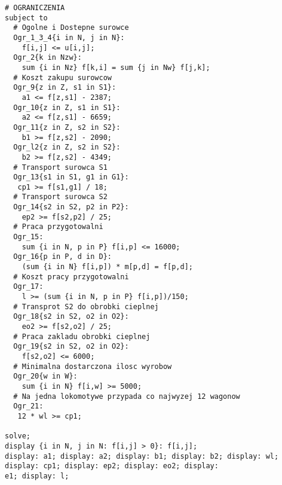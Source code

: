 \documentclass[12pt]{article}
\begin{document}
\begin{lstlisting}[caption= plik mod]
# OGRANICZENIA
subject to
  # Ogolne i Dostepne surowce
  Ogr_1_3_4{i in N, j in N}:
    f[i,j] <= u[i,j];
  Ogr_2{k in Nzw}:
    sum {i in Nz} f[k,i] = sum {j in Nw} f[j,k];    
  # Koszt zakupu surowcow
  Ogr_9{z in Z, s1 in S1}:
    a1 <= f[z,s1] - 2387;
  Ogr_10{z in Z, s1 in S1}:
    a2 <= f[z,s1] - 6659;
  Ogr_11{z in Z, s2 in S2}:
    b1 >= f[z,s2] - 2090;
  Ogr_l2{z in Z, s2 in S2}:
    b2 >= f[z,s2] - 4349;
  # Transport surowca S1
  Ogr_13{s1 in S1, g1 in G1}:
   cp1 >= f[s1,g1] / 18;
  # Transport surowca S2
  Ogr_14{s2 in S2, p2 in P2}:
    ep2 >= f[s2,p2] / 25;
  # Praca przygotowalni
  Ogr_15: 
    sum {i in N, p in P} f[i,p] <= 16000;
  Ogr_16{p in P, d in D}:
    (sum {i in N} f[i,p]) * m[p,d] = f[p,d];
  # Koszt pracy przygotowalni
  Ogr_17: 
    l >= (sum {i in N, p in P} f[i,p])/150;
  # Transprot S2 do obrobki cieplnej
  Ogr_18{s2 in S2, o2 in O2}:
    eo2 >= f[s2,o2] / 25;
  # Praca zakladu obrobki cieplnej
  Ogr_19{s2 in S2, o2 in O2}:
    f[s2,o2] <= 6000;
  # Minimalna dostarczona ilosc wyrobow
  Ogr_20{w in W}:
   	sum {i in N} f[i,w] >= 5000;
  # Na jedna lokomotywe przypada co najwyzej 12 wagonow
  Ogr_21:
   12 * wl >= cp1;
  
solve;
display {i in N, j in N: f[i,j] > 0}: f[i,j];
display: a1; display: a2; display: b1; display: b2; display: wl;
display: cp1; display: ep2; display: eo2; display: 
e1; display: l;
\end{lstlisting}
\end{document}
